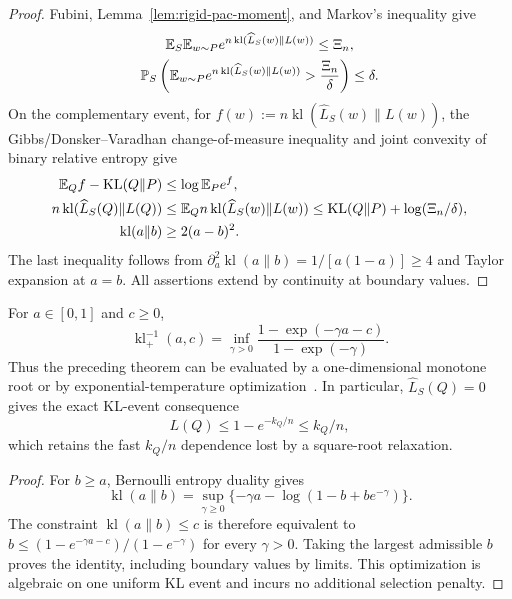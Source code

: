 \begin{proof}
Fubini, Lemma~\ref{lem:rigid-pac-moment}, and Markov's inequality give
\begin{gather}
 \mathbb E_S\mathbb E_{w\sim P}e^{n\operatorname{kl}(\widehat L_S(w)\|L(w))}\le\Xi_n,\\
 \mathbb P_S\left(\mathbb E_{w\sim P}e^{n\operatorname{kl}(\widehat L_S(w)\|L(w))}
                       >\frac{\Xi_n}{\delta}\right)\le\delta.
\end{gather}
On the complementary event, for $f(w):=n\operatorname{kl}(\widehat L_S(w)\|L(w))$,
the Gibbs/Donsker--Varadhan change-of-measure inequality
\citep{donsker1975asymptotic} and joint convexity of binary relative entropy give
\begin{align}
 \mathbb E_Q f-\operatorname{KL}(Q\|P)
 &\le\log\mathbb E_Pe^f,\\
 n\operatorname{kl}(\widehat L_S(Q)\|L(Q))
 &\le\mathbb E_Qn\operatorname{kl}(\widehat L_S(w)\|L(w))
 \le\operatorname{KL}(Q\|P)+\log(\Xi_n/\delta),\\
 \operatorname{kl}(a\|b)&\ge2(a-b)^2.
\end{align}
The last inequality follows from
$\partial_a^2\operatorname{kl}(a\|b)=1/[a(1-a)]\ge4$ and Taylor expansion at
$a=b$. All assertions extend by continuity at boundary values.
\end{proof}
\begin{corollary}\label{cor:catoni-inverse}
For $a\in[0,1]$ and $c\ge0$,
\begin{equation}
 \operatorname{kl}_+^{-1}(a,c)
 =\inf_{\gamma>0}\frac{1-\exp(-\gamma a-c)}{1-\exp(-\gamma)}.
\end{equation}
Thus the preceding theorem can be evaluated by a one-dimensional monotone
root or by exponential-temperature optimization~\citep{catoni2007pac}.
In particular, $\widehat L_S(Q)=0$ gives the exact KL-event consequence
\begin{equation}
 L(Q)\le1-e^{-k_Q/n}\le k_Q/n,
\end{equation}
which retains the fast $k_Q/n$ dependence lost by a square-root relaxation.
\end{corollary}
\begin{proof}
For $b\ge a$, Bernoulli entropy duality gives
\begin{equation}
 \operatorname{kl}(a\|b)
 =\sup_{\gamma\ge0}\{-\gamma a-\log(1-b+be^{-\gamma})\}.
\end{equation}
The constraint $\operatorname{kl}(a\|b)\le c$ is therefore equivalent to
$b\le(1-e^{-\gamma a-c})/(1-e^{-\gamma})$ for every $\gamma>0$.
Taking the largest admissible $b$ proves the identity, including boundary
values by limits. This optimization is algebraic on one uniform KL event and
incurs no additional selection penalty.
\end{proof}

